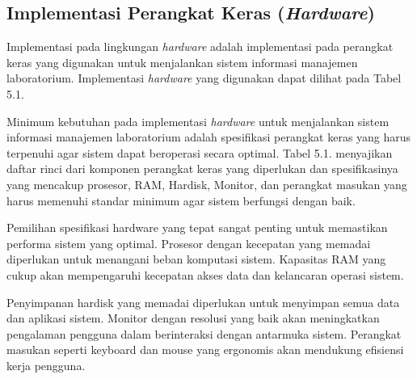 \subsection{Implementasi Perangkat Keras (\textit{Hardware})}
Implementasi pada lingkungan \textit{hardware} adalah implementasi pada perangkat keras yang digunakan untuk menjalankan sistem informasi manajemen laboratorium. Implementasi \textit{hardware} yang digunakan dapat dilihat pada Tabel 5.1.

Minimum kebutuhan pada implementasi \textit{hardware} untuk menjalankan sistem informasi manajemen laboratorium adalah spesifikasi perangkat keras yang harus terpenuhi agar sistem dapat beroperasi secara optimal. Tabel 5.1. menyajikan daftar rinci dari komponen perangkat keras yang diperlukan dan spesifikasinya yang mencakup prosesor, RAM, Hardisk, Monitor, dan perangkat masukan yang harus memenuhi standar minimum agar sistem berfungsi dengan baik.

Pemilihan spesifikasi hardware yang tepat sangat penting untuk memastikan performa sistem yang optimal. Prosesor dengan kecepatan yang memadai diperlukan untuk menangani beban komputasi sistem. Kapasitas RAM yang cukup akan mempengaruhi kecepatan akses data dan kelancaran operasi sistem.

Penyimpanan hardisk yang memadai diperlukan untuk menyimpan semua data dan aplikasi sistem. Monitor dengan resolusi yang baik akan meningkatkan pengalaman pengguna dalam berinteraksi dengan antarmuka sistem. Perangkat masukan seperti keyboard dan mouse yang ergonomis akan mendukung efisiensi kerja pengguna.

